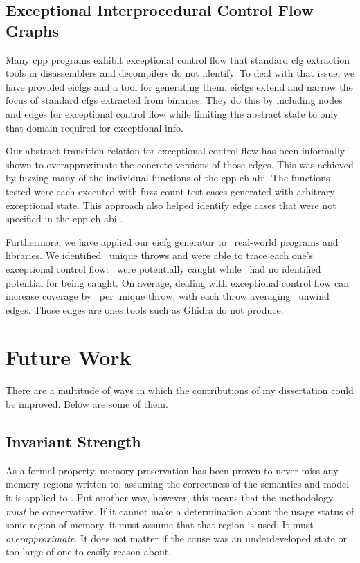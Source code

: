 \subsection{Exceptional Interprocedural Control Flow Graphs}
Many \gls{cpp} programs exhibit exceptional control flow that standard \ac{cfg} extraction tools in disassemblers and decompilers do not identify.
To deal with that issue, we have provided \acp{eicfg} and a tool for generating them.
\acp{eicfg} extend and narrow the focus of standard \acp{cfg} extracted from binaries.
They do this by including nodes and edges for exceptional control flow while limiting the abstract state to only that domain required for exceptional info.

Our abstract transition relation for exceptional control flow has been informally shown to overapproximate the concrete versions of those edges.
This was achieved by fuzzing many of the individual functions of the \gls{cpp} \ac{eh} \ac{abi}.
The functions tested were each executed with \gls{fuzz-count} test cases generated with arbitrary exceptional state.
This approach also helped identify edge cases that were not specified in the \gls{cpp} \ac{eh} \ac{abi} \cite{cxxEhAbi}.

Furthermore, we have applied our \ac{eicfg} generator to \totalbins\ real-world programs and libraries.
We identified \uniquethrows\ unique throws and were able to trace each one's exceptional control flow: \caughtthrows\ were potentially caught while \uncaughtthrows\ had no identified potential for being caught.
On average, dealing with exceptional control flow can increase coverage by \avgdiffinst\ per unique throw, with each throw averaging \avgunwinds\ unwind edges.
Those edges are ones tools such as Ghidra do not produce.

\section{Future Work}
There are a multitude of ways in which the contributions of my dissertation could be improved.
Below are some of them.

\subsection{Invariant Strength}
As a formal property, memory preservation has been proven to never miss any memory regions written to, assuming the correctness of the semantics and model it is applied to \autocite{bockenek2019preservation,verbeek2022lifting}.
Put another way, however, this means that the methodology \emph{must} be conservative.
If it cannot make a determination about the usage status of some region of memory,
it must assume that that region is used. It must \emph{overapproximate}.%
It does not matter if the cause was an underdeveloped state or too large of one to easily reason about.

